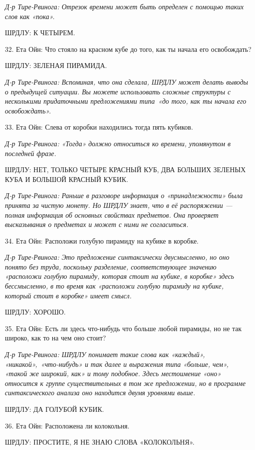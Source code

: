\documentclass[../main.tex]{subfiles}
\begin{document}
\begin{dialogue}
\emph{Д-р Тире-Рвинога: Отрезок времени может быть определен с помощью таких слов как «пока».}

ШРДЛУ: К ЧЕТЫРЕМ.

32. Ета Ойн: Что стояло на красном кубе до того, как ты начала его освобождать?

ШРДЛУ: ЗЕЛЕНАЯ ПИРАМИДА.

\emph{Д-р Тире-Рвинога: Вспоминая, что она сделала, ШРДЛУ может делать выводы о предыдущей ситуации. Вы можете использовать сложные структуры с несколькими придаточными предложениями типа~«до того, как ты начала его освобождать».}

33. Ета Ойн: Слева от коробки находились тогда пять кубиков.

\emph{Д-р Тире-Рвинога: «Тогда» должно относиться ко времени, упомянутом в последней фразе.}

ШРДЛУ: НЕТ, ТОЛЬКО ЧЕТЫРЕ КРАСНЫЙ КУБ, ДВА БОЛЬШИХ ЗЕЛЕНЫХ КУБА И БОЛЬШОЙ КРАСНЫЙ КУБИК.

\emph{Д-р Тире-Рвинога: Раньше в разговоре информация о «принадлежности» была принята за чистую монету. Но ШРДЛУ знает, что в её распоряжении --- полная информация об основных свойствах предметов. Она проверяет высказывания о предметах и может с ними не согласиться.}

34. Ета Ойн: Расположи голубую пирамиду на кубике в коробке.

\emph{Д-р Тире-Рвинога: Это предложение синтаксически двусмысленно, но оно понято без труда, поскольку разделение, соответствующее значению «расположи голубую пирамиду, которая стоит на кубике, в коробке» здесь бессмысленно, в то время как «расположи голубую пирамиду на кубике, который стоит в коробке» имеет смысл.}

ШРДЛУ: ХОРОШО.

35. Ета Ойн: Есть ли здесь что-нибудь что больше любой пирамиды, но не так широко, как то на чем оно стоит?

\emph{Д-р Тире-Рвинога: ШРДЛУ понимает такие слова как «каждый», «никакой»,~«что-нибудь» и так далее и выражения типа «больше, чем», «такой же широкий, как» и тому подобное. Здесь местоимение «оно» относится к группе существительных в том же предложении, но в программе синтаксического анализа оно находится двумя уровнями выше.}

ШРДЛУ: ДА ГОЛУБОЙ КУБИК.

36. Ета Ойн: Расположена ли колокольня.

ШРДЛУ: ПРОСТИТЕ, Я НЕ ЗНАЮ СЛОВА «КОЛОКОЛЬНЯ».


\end{dialogue}
\end{document}
